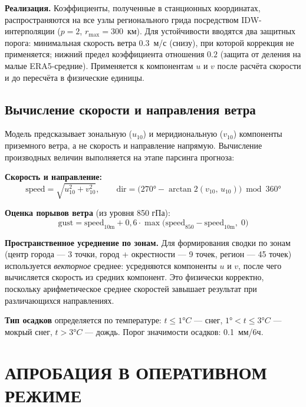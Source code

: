 \documentclass[14pt,a4paper]{extarticle}
\numberwithin{table}{section}
\numberwithin{figure}{section}
\numberwithin{equation}{section}
\begin{document}
\textbf{Реализация.} Коэффициенты, полученные в станционных
координатах, распространяются на все узлы регионального грида
посредством IDW-интерполяции (\(p=2\), \(r_{\max}=300\)~км). Для
устойчивости вводятся два защитных порога: минимальная скорость ветра
\(0.3\)~м/с (снизу), при которой коррекция не применяется; нижний предел
коэффициента отношения \(0.2\) (защита от деления на малые
ERA5-средние). Применяется к компонентам \(u\) и \(v\) после расчёта
скорости и до пересчёта в физические единицы.

\subsection{Вычисление скорости и направления
ветра}\label{wind-speed-direction}

Модель предсказывает зональную ($u_{10}$) и меридиональную ($v_{10}$)
компоненты приземного ветра, а не скорость и направление напрямую.
Вычисление производных величин выполняется на этапе парсинга прогноза:

\textbf{Скорость и направление:}
\[
  \text{speed} = \sqrt{u_{10}^2 + v_{10}^2}, \qquad
  \text{dir} = \bigl(270° - \arctan2(v_{10},\, u_{10})\bigr) \bmod 360°
\]

\textbf{Оценка порывов ветра} (из уровня 850 гПа):
\[
  \text{gust} = \text{speed}_{10\text{m}} + 0{,}6 \cdot
  \max\!\bigl(\text{speed}_{850} - \text{speed}_{10\text{m}},\; 0\bigr)
\]

\textbf{Пространственное усреднение по зонам.}
Для формирования сводки по зонам (центр города --- 3 точки, город +
окрестности --- 9 точек, регион --- 45 точек) используется
\emph{векторное} среднее: усредняются компоненты $u$ и $v$, после чего
вычисляется скорость из средних компонент. Это физически корректно,
поскольку арифметическое среднее скоростей завышает результат при
различающихся направлениях.

\textbf{Тип осадков} определяется по температуре: $t \leq 1°C$ --- снег,
$1° < t \leq 3°C$ --- мокрый снег, $t > 3°C$ --- дождь. Порог
значимости осадков: 0.1~мм/6ч.


\newpage

\section{АПРОБАЦИЯ В ОПЕРАТИВНОМ РЕЖИМЕ}\label{ux430ux43fux440ux43eux431ux430ux446ux438ux44f-ux432-ux43eux43fux435ux440ux430ux442ux438ux432ux43dux43eux43c-ux440ux435ux436ux438ux43cux435}
\end{document}
